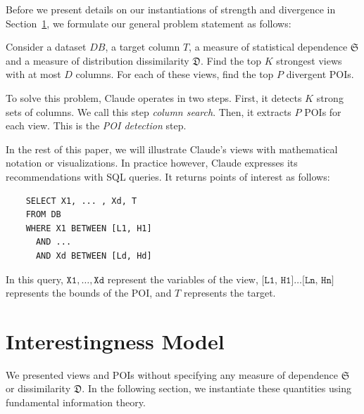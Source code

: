 Before we present details on our instantiations of strength and divergence in Section~\ref{sec:formalization}, we formulate our general problem statement as follows:
\begin{problem}
Consider a dataset $DB$, a target column $T$, a measure of statistical
dependence $\mathfrak{S}$ and a measure of distribution dissimilarity
$\mathfrak{D}$. Find the top $K$ strongest views with at most $D$ columns. For
each of these views, find the top $P$ divergent POIs.
\end{problem}
To solve this problem, Claude operates in two steps. First, it detects $K$
strong sets of columns.  We call this step \emph{column search}.  Then, it
extracts $P$ POIs for each view. This is the \emph{POI detection} step.

In the rest of this paper, we will illustrate Claude's views with mathematical
notation or visualizations. In practice however, Claude expresses its
recommendations with SQL queries. It returns points of interest as follows:
\begin{verbatim}
    SELECT X1, ... , Xd, T
    FROM DB
    WHERE X1 BETWEEN [L1, H1]
      AND ... 
      AND Xd BETWEEN [Ld, Hd]
\end{verbatim}
In this query, $\texttt{X1},\ldots, \texttt{Xd}$ represent the variables of the
view, $\texttt{[L1, H1]}\ldots\texttt{[Ln, Hn]}$ represents the bounds of the
POI, and $T$ represents the target.




\section{Interestingness Model}
\label{sec:formalization}
We presented views and POIs without specifying any measure of dependence
$\mathfrak{S}$ or dissimilarity $\mathfrak{D}$. In the following section, we
instantiate these quantities using fundamental information theory.

